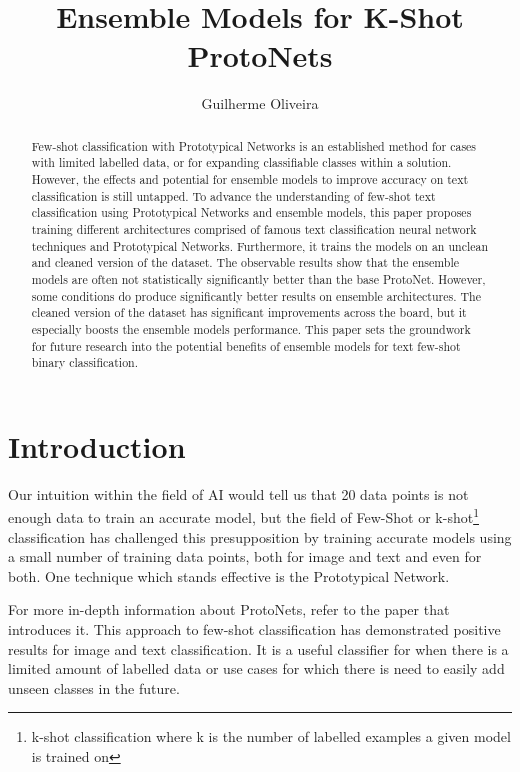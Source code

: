 \documentclass[letterpaper]{article} %
\title{Ensemble Models for K-Shot ProtoNets}
\author{
    Guilherme Oliveira
}
\begin{document}
\maketitle

\begin{abstract}
  Few-shot classification with Prototypical Networks is an established method for cases with limited labelled data, or for expanding classifiable classes within a solution. However, the effects and potential for ensemble models to improve accuracy on text classification is still untapped.
  To advance the understanding of few-shot text classification using Prototypical Networks and ensemble models, this paper proposes training different architectures comprised of famous text classification neural network techniques and Prototypical Networks. Furthermore, it trains the models on an unclean and cleaned version of the dataset.
  The observable results show that the ensemble models are often not statistically significantly better than the base ProtoNet. However, some conditions do produce significantly better results on ensemble architectures.
  The cleaned version of the dataset has significant improvements across the board, but it especially boosts the ensemble models performance.
  This paper sets the groundwork for future research into the potential benefits of ensemble models for text few-shot binary classification. 
\end{abstract}

\section{Introduction}
  Our intuition within the field of AI would tell us that 20 data points is not enough data to train an accurate model, but the field of Few-Shot or k-shot\footnote{k-shot classification where k is the number of labelled examples a given model is trained on} classification has challenged this presupposition by training accurate models using a small number of training data points, both for image\cite{NIPS2017_cb8da676, hou2022closerlookprototypeclassifier, JI202081} and text\cite{sun-etal-2019-hierarchical, electronics11152423, Sourati2023-bq, Liu2025-gf} and even for both\cite{Pahde_2021_WACV}.
  One technique which stands effective is the Prototypical Network.

  For more in-depth information about ProtoNets, refer to the paper that introduces it\cite{NIPS2017_cb8da676}.
  This approach to few-shot classification has demonstrated positive results for image\cite{NIPS2017_cb8da676,hou2022closerlookprototypeclassifier, JI202081} and text classification\cite{sun-etal-2019-hierarchical,electronics11152423,Sourati2023-bq,Liu2025-gf}. It is a useful classifier for when there is a limited amount of labelled data or use cases for which there is need to easily add unseen classes in the future.
\end{document}
